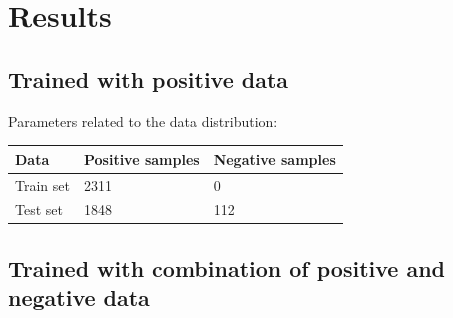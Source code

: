   \section{Results}  
  
  \subsection{Trained with positive data}
   Parameters related to the  data distribution:
  \begin{table}[h]
  	\begin{tabular}{|l|l|l|}
  		\hline
  		Data      & Positive samples & Negative samples \\ \hline
  		Train set & 2311             & 0                \\ \hline
  		Test set  & 1848             & 112              \\ \hline
  	\end{tabular}
  \end{table}
   	
   	
   	
 
  
     \subsection{Trained with combination of positive  and negative data}

